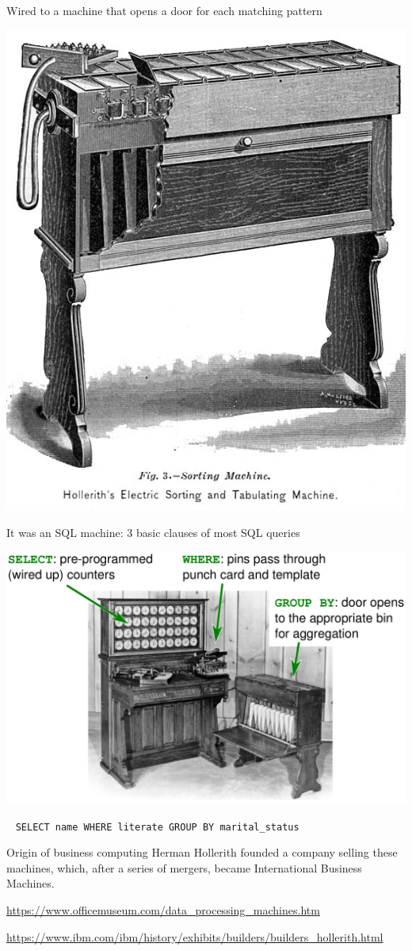 \documentclass[aspectratio=169]{beamer}
\begin{document}
\begin{frame}{Wired to a machine that opens a door for each matching pattern}
\vspace{0.25 cm}
\begin{center}
\includegraphics[width=0.45\linewidth]{1890_Hollerith_Sorting_Machine_OM.jpg}
\end{center}
\end{frame}

\begin{frame}{It was an SQL machine: 3 basic clauses of most SQL queries}
\vspace{0.25 cm}
\begin{center}
\includegraphics[width=0.75\linewidth]{hh-tabulator.pdf}
\end{center}

\mbox{ } \hfill \texttt{SELECT name WHERE literate GROUP BY marital_status} \hfill \mbox{ }
\end{frame}

\begin{frame}{Origin of business computing}
\Large
\vspace{0.5 cm}
Herman Hollerith founded a company selling these machines, which, after a series of mergers, became International Business Machines.

\small
\vspace{1 cm}
\textcolor{blue}{\url{https://www.officemuseum.com/data_processing_machines.htm}}

\vspace{0.25 cm}
\textcolor{blue}{\url{https://www.ibm.com/ibm/history/exhibits/builders/builders_hollerith.html}}
\end{frame}
\end{document}
